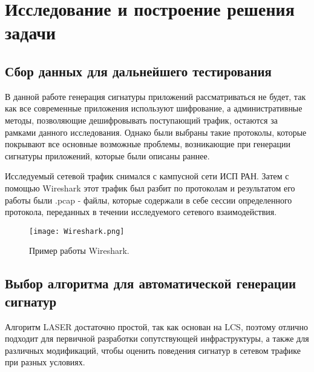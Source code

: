 \section{Исследование и построение решения задачи}
\label{sec:Section3} 

\subsection{Сбор данных для дальнейшего тестирования}

В данной работе генерация сигнатуры приложений рассматриваться не будет,
так как все современные приложения используют шифрование, а административные методы,
позволяющие дешифровывать поступающий трафик, остаются за рамками данного исследования.
Однако были выбраны такие протоколы, которые покрывают все основные возможные проблемы,
возникающие при генерации сигнатуры приложений, которые были описаны раннее.

Исследуемый сетевой трафик снимался с кампусной сети ИСП РАН. Затем с помощью Wireshark \cite{Wireshark}
этот трафик был разбит по протоколам и результатом его работы были .pcap - файлы,
которые содержали в себе сессии определенного протокола, переданных в течении исследуемого сетевого взаимодействия.

\begin{figure}[H]
    \begin{center}
        \texttt{[image: Wireshark.png]}
        \caption{Пример работы Wireshark.}
    \end{center}
\end{figure}

\subsection{Выбор алгоритма для автоматической генерации сигнатур}
Алгоритм LASER достаточно простой, так как основан на LCS, поэтому отлично подходит для первичной разработки сопутствующей инфраструктуры,
а также для различных модификаций, чтобы оценить поведения сигнатур в сетевом трафике при разных условиях.


